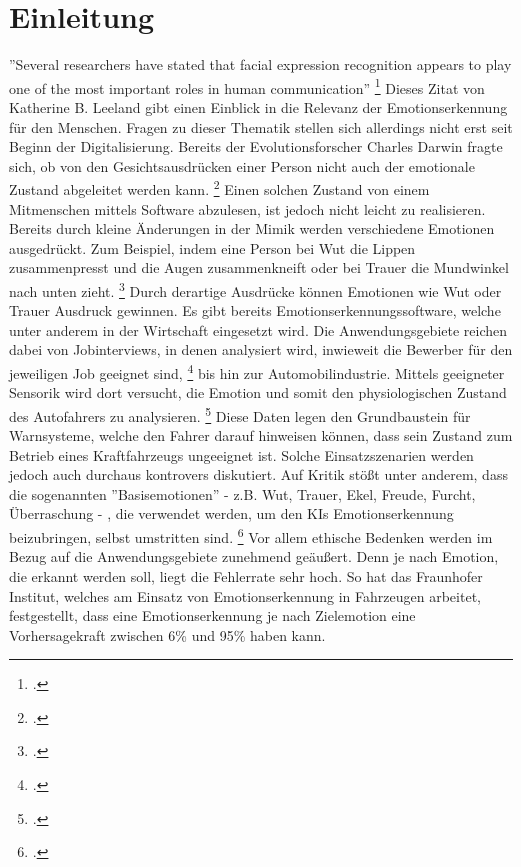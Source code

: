\documentclass[12pt, a4paper]{report}
\begin{document}
\newpage
\renewcommand{\thefigure}{\Alph{chapter}.\alph{figure}}
\renewcommand{\thetable}{\Roman{chapter}.\Roman{table}}

\tableofcontents
\listoffigures
\listoftables
\lstlistoflistings
\newpage
\chapter{Einleitung}
\pagestyle{plain}
\setcounter{page}{1}
''Several researchers have stated that facial expression recognition appears to play one of the most important roles in human communication'' 
\footcite[Vgl.][1]{FaceRec}
Dieses Zitat von Katherine B. Leeland gibt einen Einblick in die Relevanz der Emotionserkennung für den Menschen. Fragen zu dieser Thematik stellen sich allerdings nicht erst seit Beginn der Digitalisierung. Bereits der Evolutionsforscher Charles Darwin
fragte sich, ob von den Gesichtsausdrücken einer Person nicht auch der emotionale Zustand abgeleitet werden kann.
\footcite[Vgl.][2]{FaceRec}
Einen solchen Zustand von einem Mitmenschen mittels Software abzulesen, ist jedoch nicht leicht zu realisieren. Bereits durch kleine Änderungen in der Mimik werden verschiedene Emotionen ausgedrückt. Zum Beispiel, indem eine Person bei Wut die Lippen zusammenpresst und die Augen zusammenkneift oder bei Trauer die Mundwinkel nach unten zieht.
\footcite[Vgl.][249]{HandbookFaceRec}
Durch derartige Ausdrücke können Emotionen wie Wut oder Trauer Ausdruck gewinnen.
Es gibt bereits Emotionserkennungssoftware, welche unter anderem in der Wirtschaft eingesetzt wird. Die Anwendungsgebiete reichen dabei von Jobinterviews, in denen analysiert wird, inwieweit die Bewerber für den jeweiligen Job geeignet sind,
\footcite[Vgl.][]{mixedArticle}
bis hin zur Automobilindustrie. Mittels geeigneter Sensorik wird dort versucht, die Emotion und somit den physiologischen Zustand des Autofahrers zu analysieren.
\footcite[Vgl.][Herausforderung]{Frauenhofer}
Diese Daten legen den Grundbaustein für Warnsysteme, welche den Fahrer darauf hinweisen können, dass sein Zustand zum Betrieb eines Kraftfahrzeugs ungeeignet ist. Solche Einsatzszenarien werden jedoch auch durchaus kontrovers diskutiert. Auf Kritik stößt unter anderem, dass die sogenannten ''Basisemotionen'' - z.B. Wut, Trauer, Ekel, Freude, Furcht, Überraschung - , die verwendet werden, um den KIs Emotionserkennung beizubringen, selbst umstritten sind.
\footcite[Vgl.][]{SZ}
Vor allem ethische Bedenken werden im Bezug auf die Anwendungsgebiete zunehmend geäußert. Denn je nach Emotion, die erkannt werden soll, liegt die Fehlerrate sehr hoch. So hat das Fraunhofer Institut, welches am Einsatz von Emotionserkennung in Fahrzeugen arbeitet, festgestellt, dass eine Emotionserkennung je nach Zielemotion eine Vorhersagekraft zwischen 6\% und 95\% haben kann.
\end{document}
